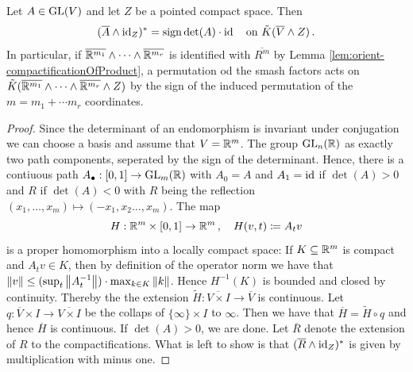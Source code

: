 \begin{lemma}\label{lem:orient-linearMapsOnSmashProducts}
	Let $A\in \mathrm{GL}(V)$ and let $Z$ be a pointed compact space. Then
\begin{equation*}
	(\overline{A}\wedge \operatorname{\mathrm{id}}_Z)^*=\mathrm{sign} \det(A)\cdot \operatorname{\mathrm{id}} \quad \text{on }\tilde{K}(\overline{V}\wedge Z)\,.
\end{equation*}
In particular, if $\overline{\mathbb{R}^{m_1}}\wedge \cdots \wedge\overline{\mathbb{R}^{m_r}}$ is identified with $\overline{R^m}$ by Lemma \ref{lem:orient-compactificationOfProduct}, a permutation od the smash factors acts on $\tilde{K}(\overline{\mathbb{R}^{m_1}}\wedge \cdots \wedge\overline{\mathbb{R}^{m_r}}\wedge Z)$ by the sign of the induced permutation of the $m=m_1+\cdots m_r$ coordinates.
\end{lemma}
\begin{proof}
 Since the determinant of an endomorphism is invariant under conjugation we can choose a basis and assume that $V=\mathbb{R}^m$. The group $\mathrm{GL}_n(\mathbb{R})$ as exactly two path components, seperated by the sign of the determinant. Hence, there is a contiuous path $A_{\bullet}:[0,1]\to \mathrm{GL}_m(\mathbb{R})$  with $A_0=A$ and $A_1=\operatorname{\mathrm{id}}$ if $\det(A)>0$ and $R$ if $\det(A)<0$ with $R$ being the reflection $(x_1,\dots,x_m)\mapsto (-x_1,x_2\dots,x_m)$. The map 
    \begin{equation*}
        H:\mathbb{R}^m\times[0,1]\to \mathbb{R}^m\,,\quad H(v,t)\coloneq A_tv
    \end{equation*} is a proper homomorphism into a locally compact space: If $K\subseteq \mathbb{R}^m$ is compact and $A_tv\in K$, then by definition of the operator norm we have that $\left\lVert v\right\rVert\leq (\sup_t\left\lVert A^{-1}_t\right\rVert)\cdot \max_{k\in K}\left\lVert k\right\rVert$. Hence $H^{-1}(K)$ is bounded and closed by continuity. Thereby the the extension $\tilde{H}:\overline{V\times I}\to \overline{V}$ is continuous. Let $q:\overline{V}\times I\to \overline{V\times I}$ be the collaps of $\{\infty\}\times I$ to $\infty$. Then we have that $\overline{H}=\tilde{H}\circ q$ and hence $\overline{H}$ is continuous. If $\det(A)>0$, we are done. Let $\overline{R}$ denote the extension of $R$ to the compactifications. What is left to show is that $(\overline{R}\wedge \operatorname{\mathrm{id}}_Z)^*$ is given by multiplication with minus one.



\end{proof}

